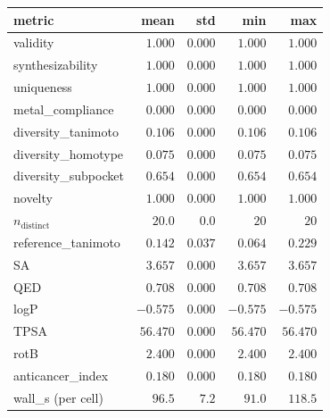 {\begin{center}
\small
\setlength{\tabcolsep}{4pt}
\begin{tabular}{lrrrr}
\toprule
\textbf{metric} & \textbf{mean} & \textbf{std} & \textbf{min} & \textbf{max}\\
\midrule
validity             & $1.000$ & $0.000$ & $1.000$ & $1.000$\\
synthesizability     & $1.000$ & $0.000$ & $1.000$ & $1.000$\\
uniqueness           & $1.000$ & $0.000$ & $1.000$ & $1.000$\\
metal\_compliance    & $0.000$ & $0.000$ & $0.000$ & $0.000$\\
diversity\_tanimoto  & $0.106$ & $0.000$ & $0.106$ & $0.106$\\
diversity\_homotype  & $0.075$ & $0.000$ & $0.075$ & $0.075$\\
diversity\_subpocket & $0.654$ & $0.000$ & $0.654$ & $0.654$\\
novelty              & $1.000$ & $0.000$ & $1.000$ & $1.000$\\
$n_{\text{distinct}}$& $20.0$  & $0.0$   & $20$    & $20$\\
reference\_tanimoto  & $0.142$ & $0.037$ & $0.064$ & $0.229$\\
SA                   & $3.657$ & $0.000$ & $3.657$ & $3.657$\\
QED                  & $0.708$ & $0.000$ & $0.708$ & $0.708$\\
logP                 & $-0.575$ & $0.000$ & $-0.575$ & $-0.575$\\
TPSA                 & $56.470$ & $0.000$ & $56.470$ & $56.470$\\
rotB                 & $2.400$  & $0.000$ & $2.400$  & $2.400$\\
anticancer\_index    & $0.180$  & $0.000$ & $0.180$  & $0.180$\\
wall\_s (per cell)   & $96.5$  & $7.2$   & $91.0$   & $118.5$\\
\bottomrule
\end{tabular}
\end{center}

}
